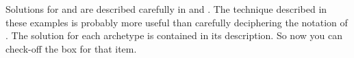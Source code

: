 Solutions for  and  are described carefully in  and .  The technique described in these examples is probably more useful than carefully deciphering the notation of .  The solution for each archetype is contained in its description.  So now you can check-off the box for that item.
